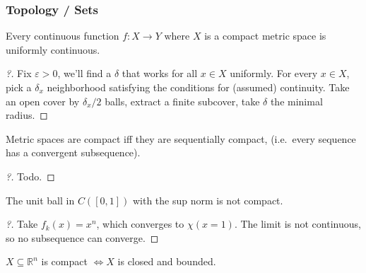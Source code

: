 \hypertarget{topology-sets}{%
\subsubsection{Topology / Sets}\label{topology-sets}}

\begin{theorem}

Every continuous function \(f:X\to Y\) where \(X\) is a compact metric
space is uniformly continuous.

\end{theorem}

\begin{proof}[?]

Fix \({\varepsilon}>0\), we'll find a \(\delta\) that works for all
\(x\in X\) uniformly. For every \(x\in X\), pick a \(\delta_x\)
neighborhood satisfying the conditions for (assumed) continuity. Take an
open cover by \(\delta_x/2\) balls, extract a finite subcover, take
\(\delta\) the minimal radius.

\end{proof}

\begin{proposition}

Metric spaces are compact iff they are sequentially compact, (i.e.~every
sequence has a convergent subsequence).

\end{proposition}

\begin{proof}[?]

Todo. 

\end{proof}

\begin{proposition}

The unit ball in \(C([0, 1])\) with the sup norm is not compact.

\end{proposition}

\begin{proof}[?]

Take \(f_k(x) = x^n\), which converges to \(\chi(x=1)\). The limit is
not continuous, so no subsequence can converge.

\end{proof}

\begin{theorem}

\(X\subseteq {\mathbb{R}}^n\) is compact \(\iff X\) is closed and
bounded.

\end{theorem}

